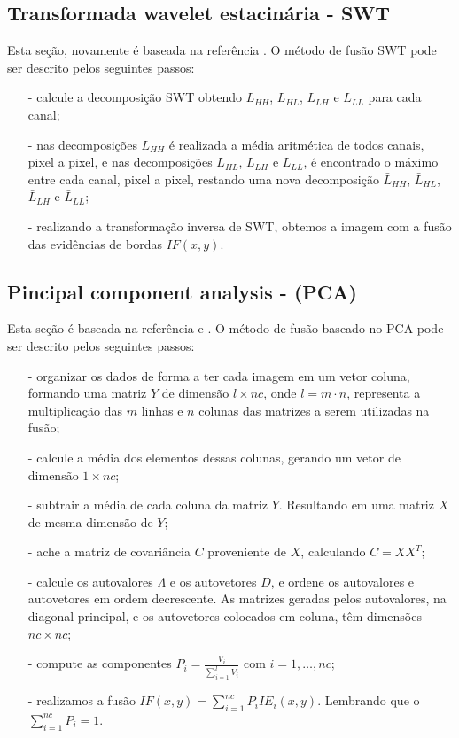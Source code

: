 \documentclass[conference]{IEEEtran}
\begin{document}
\subsection{Transformada wavelet estacinária - SWT} Esta seção, novamente é baseada na referência \cite{n_r}. O método de fusão SWT pode ser descrito pelos seguintes passos:
\begin{itemize}
\item[-] calcule a decomposição SWT obtendo $L_{HH}$, $L_{HL}$, $L_{LH}$ e $L_{LL}$ para cada canal;
\item[-] nas decomposições $L_{HH}$ é realizada a média aritmética de todos canais, pixel a pixel, e nas decomposições $L_{HL}$, $L_{LH}$ e $L_{LL}$, é encontrado o máximo entre cada canal, pixel a pixel, restando uma nova decomposição $\bar{L}_{HH}$, $\bar{L}_{HL}$, $\bar{L}_{LH}$ e $\bar{L}_{LL}$;
\item[-] realizando a transformação inversa de SWT, obtemos a imagem com a fusão das evidências de bordas $IF(x,y)$.  
\end{itemize}
\subsection{Pincipal component analysis - (PCA) }
Esta seção é baseada na referência \cite{n_r} e \cite{mit}. O método de fusão baseado no PCA pode ser descrito pelos seguintes passos:
\begin{itemize}
\item[-] organizar os dados de forma a ter cada imagem em um vetor coluna, formando uma matriz $Y$ de dimensão $l\times nc$, onde $l=m\cdot n$, representa a multiplicação das $m$ linhas e $n$ colunas das matrizes a serem utilizadas na fusão;
\item[-] calcule a média dos elementos dessas colunas, gerando um vetor de dimensão $1\times nc$;
\item[-] subtrair a média de cada coluna da matriz $Y$. Resultando em uma matriz $X$ de mesma dimensão de $Y$; 
\item[-] ache a matriz de covariância $C$ proveniente de $X$, calculando $C=XX^T$;
\item[-] calcule os autovalores $\Lambda$ e os autovetores $D$, e ordene os autovalores e autovetores em ordem decrescente. As matrizes geradas pelos autovalores, na diagonal principal, e os autovetores colocados em coluna, têm dimensões $nc\times nc$;
\item[-] compute as componentes $P_i=\frac{V_i}{\sum_{i=1}^l V_i}$ com $i=1,\dots,nc$;
\item[-] realizamos a fusão $IF(x,y)=\sum_{i=1}^{nc}P_iIE_i(x,y)$. Lembrando que o $\sum_{i=1}^{nc}P_i=1$.
\end{itemize}
\end{document}
